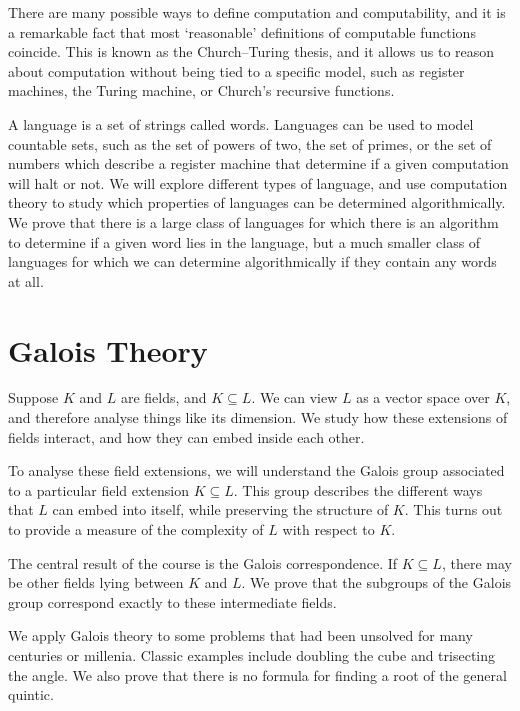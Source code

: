 There are many possible ways to define computation and computability, and it is a remarkable fact that most `reasonable' definitions of computable functions coincide.
This is known as the Church--Turing thesis, and it allows us to reason about computation without being tied to a specific model, such as register machines, the Turing machine, or Church's recursive functions.

A language is a set of strings called words.
Languages can be used to model countable sets, such as the set of powers of two, the set of primes, or the set of numbers which describe a register machine that determine if a given computation will halt or not.
We will explore different types of language, and use computation theory to study which properties of languages can be determined algorithmically.
We prove that there is a large class of languages for which there is an algorithm to determine if a given word lies in the language, but a much smaller class of languages for which we can determine algorithmically if they contain any words at all.



\chapter{Galois Theory}
Suppose \( K \) and \( L \) are fields, and \( K \subseteq L \).
We can view \( L \) as a vector space over \( K \), and therefore analyse things like its dimension.
We study how these extensions of fields interact, and how they can embed inside each other.

To analyse these field extensions, we will understand the Galois group associated to a particular field extension \( K \subseteq L \).
This group describes the different ways that \( L \) can embed into itself, while preserving the structure of \( K \).
This turns out to provide a measure of the complexity of \( L \) with respect to \( K \).

The central result of the course is the Galois correspondence.
If \( K \subseteq L \), there may be other fields lying between \( K \) and \( L \).
We prove that the subgroups of the Galois group correspond exactly to these intermediate fields.

We apply Galois theory to some problems that had been unsolved for many centuries or millenia.
Classic examples include doubling the cube and trisecting the angle.
We also prove that there is no formula for finding a root of the general quintic.

